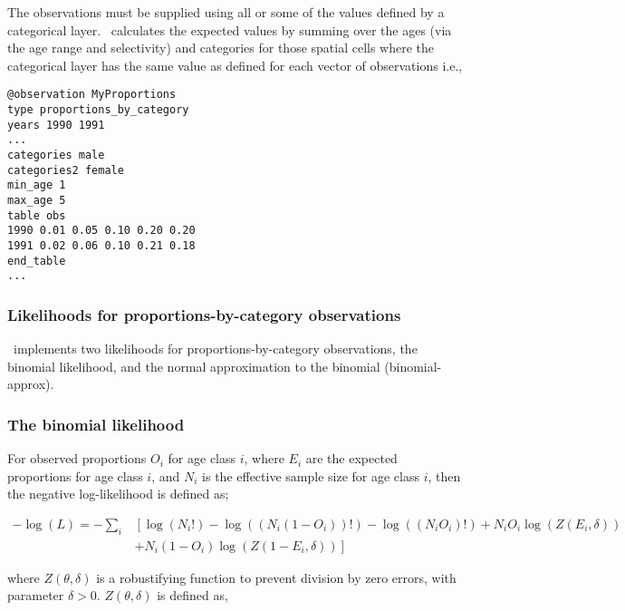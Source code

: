 {{{{The observations must be supplied using all or some of the values defined by a categorical layer. \CNAME\ calculates the expected values by summing over the ages (via the age range and selectivity) and categories for those spatial cells where the categorical layer has the same value as defined for each vector of observations i.e.,

{\small{\begin{verbatim}
@observation MyProportions
type proportions_by_category
years 1990 1991
...
categories male
categories2 female
min_age 1
max_age 5
table obs
1990 0.01 0.05 0.10 0.20 0.20
1991 0.02 0.06 0.10 0.21 0.18
end_table
...
\end{verbatim}}}


\subsubsection{Likelihoods for proportions-by-category observations}

\CNAME\ implements two likelihoods for proportions-by-category observations, the binomial likelihood, and the normal approximation to the binomial (binomial-approx). 

\subsubsection*{The binomial likelihood}

For observed proportions $O_i$ for age class $i$, where $E_i$ are the expected proportions for age class $i$, and $N_i$ is the effective sample size for age class $i$, then the negative log-likelihood is defined as;  

\begin{equation}
  \begin{split}
    -\log \left(L \right)= -\sum\limits_i & \left[ \right. \log \left(N_i! \right) - \log \left(\left(N_i \left(1 - O_i \right) \right)! \right) - \log \left(\left(N_i O_i \right)! \right) + N_i O_i \log \left(Z\left(E_i,\delta \right) \right) \\
    &+ N_i \left(1 - O_i \right)\log \left(Z\left(1 - E_i,\delta\right) \right) \left. \right]
  \end{split}
\end{equation}


where $Z \left(\theta,\delta \right)$ is a robustifying function to prevent division by zero errors, with parameter $\delta>0$. $Z \left(\theta,\delta \right)$ is defined as,

}}}}
